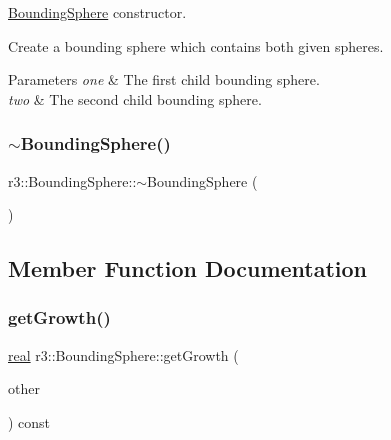 \mbox{\hyperlink{classr3_1_1_bounding_sphere}{Bounding\+Sphere}} constructor. 

Create a bounding sphere which contains both given spheres. ~\newline

\begin{DoxyParams}{Parameters}
{\em one} & The first child bounding sphere. \\
\hline
{\em two} & The second child bounding sphere. \\
\hline
\end{DoxyParams}
\mbox{\label{classr3_1_1_bounding_sphere_a9951f8922ebb2227cd97e59c97fed2a5}} 
\subsubsection{\texorpdfstring{$\sim$\+Bounding\+Sphere()}{~BoundingSphere()}}
{\footnotesize\ttfamily r3\+::\+Bounding\+Sphere\+::$\sim$\+Bounding\+Sphere (\begin{DoxyParamCaption}{ }\end{DoxyParamCaption})\hspace{0.3cm}{\ttfamily [default]}}



\subsection{Member Function Documentation}
\mbox{\label{classr3_1_1_bounding_sphere_ac13a86be56c1c52b33a707eb2356daa3}} 
\subsubsection{\texorpdfstring{get\+Growth()}{getGrowth()}}
{\footnotesize\ttfamily \mbox{\hyperlink{namespacer3_ab2016b3e3f743fb735afce242f0dc1eb}{real}} r3\+::\+Bounding\+Sphere\+::get\+Growth (\begin{DoxyParamCaption}\item[{const \mbox{\hyperlink{classr3_1_1_bounding_sphere}{Bounding\+Sphere}} \&}]{other }\end{DoxyParamCaption}) const}



